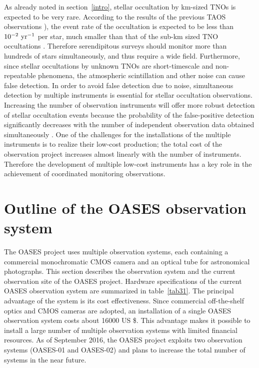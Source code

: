 \documentclass{pasj01}
\begin{document}
As already noted in section~\ref{intro}, stellar occultation by km-sized TNOs is expected to be very rare. 
According to the results of the previous TAOS observations \citep{bianco10, zhang13}), 
the event rate of the occultation is expected to be less than $10^{-2}\ {\rm yr^{-1}}$ per star, 
much smaller than that of the sub-km sized TNO occultations \citep{schlichting13}. 
Therefore serendipitous surveys should monitor more than hundreds of stars simultaneously,
and thus require a wide field.
Furthermore, since stellar occultations by unknown TNOs are short-timescale and non-repeatable phenomena,
the atmospheric scintillation and other noise can cause false detection.
In order to avoid false detection due to noise,  
simultaneous detection by multiple instruments is essential for stellar occultation observations.
Increasing the number of observation instruments 
will offer more robust detection of stellar occultation events
because the probability of the false-positive detection significantly decreases with
the number of independent observation data obtained simultaneously \citep{lehner10}.
One of the challenges for the installations of the multiple instruments 
is to realize their low-cost production;
the total cost of the observation project increases almost linearly with the number of instruments.
Therefore the development of multiple low-cost instruments has a key role in
the achievement of coordinated monitoring observations.

\section{Outline of the OASES observation system}
\label{sec:obssystem}

The OASES project uses multiple observation systems, 
each containing a commercial monochromatic CMOS camera 
and an optical tube for astronomical photographs. 
This section describes the observation system 
and the current observation site of the OASES project.
Hardware specifications 
of the current OASES observation system
are summarized in table~\ref{tab31}.
The principal advantage of the system is its cost effectiveness.
Since commercial off-the-shelf optics and CMOS cameras are adopted,
an installation of a single OASES observation system costs about 16000 US \$. %
This advantage makes it possible to 
install a large number of multiple observation systems with limited financial resources.
As of September 2016, the OASES project exploits two observation systems (OASES-01 and OASES-02)
and plans to increase the total number of systems in the near future.
\end{document}

